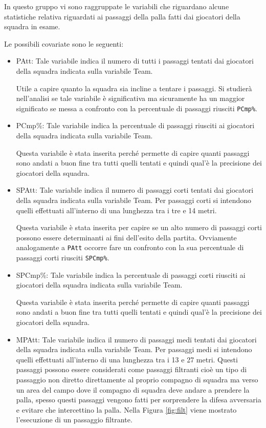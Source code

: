 In questo gruppo vi sono raggruppate le variabili che riguardano alcune statistiche relativa riguardati ai passaggi della palla fatti dai giocatori della squadra in esame.

Le possibili covariate sono le seguenti:
\begin{itemize}
	
	
	\item \textsf{PAtt}: Tale variabile indica il numero di tutti i passaggi tentati dai giocatori della squadra indicata sulla variabile \textsf{Team}. 
	
	Utile a capire quanto la squadra sia incline a tentare i passaggi. Si studierà nell'analisi se tale variabile è significativa ma sicuramente ha un maggior significato se messa a confronto con la percentuale di passaggi riusciti \texttt{PCmp\%}.
	\item\textsf{PCmp\%}: Tale variabile indica la percentuale di passaggi riusciti ai giocatori della squadra indicata sulla variabile \textsf{Team}. 
	
	Questa variabile è stata inserita perché permette di capire quanti passaggi sono andati a buon fine tra tutti quelli tentati e quindi qual'è la precisione dei giocatori della squadra.
	\item \textsf{SPAtt}: Tale variabile indica il numero di passaggi corti tentati dai giocatori della squadra indicata sulla variabile \textsf{Team}. Per passaggi corti si intendono quelli effettuati all'interno di una lunghezza tra i tre e 14 metri.
	
	Questa variabile è stata inserita per capire se un alto numero di passaggi corti possono essere determinanti ai fini dell'esito della partita. Ovviamente analogamente a \texttt{PAtt} occorre fare un confronto con la sua percentuale di passaggi corti riusciti \texttt{SPCmp\%}.
	\item \textsf{SPCmp\%}: Tale variabile indica la percentuale di passaggi corti riusciti ai giocatori della squadra indicata sulla variabile \textsf{Team}. 
	
	Questa variabile è stata inserita perché permette di capire quanti passaggi sono andati a buon fine tra tutti quelli tentati e quindi qual'è la precisione dei giocatori della squadra.
	\item \textsf{MPAtt}: Tale variabile indica il numero di passaggi medi tentati dai giocatori della squadra indicata sulla variabile \textsf{Team}. Per passaggi medi si intendono quelli effettuati all'interno di una lunghezza tra i 13 e 27 metri. Questi passaggi possono essere considerati come passaggi filtranti cioè un tipo di passaggio non diretto direttamente al proprio compagno di squadra ma verso un area del campo dove il compagno di squadra deve andare a prendere la palla, spesso questi passaggi vengono fatti per sorprendere la difesa avversaria e evitare che intercettino la palla. Nella Figura \ref{fig:filt} viene mostrato l'esecuzione di un passaggio filtrante.
	

\end{itemize}
